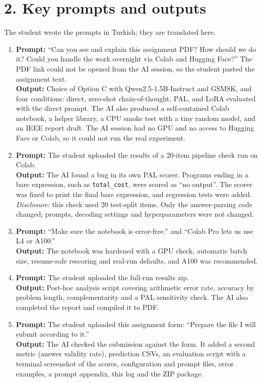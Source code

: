 \documentclass[11pt,a4paper]{article}
\begin{document}
\section*{2. Key prompts and outputs}
The student wrote the prompts in Turkish; they are translated here.
\begin{enumerate}
\item \textbf{Prompt:} ``Can you see and explain this assignment PDF? How should we do it? Could you
handle the work overnight via Colab and Hugging Face?'' The PDF link could not be opened from the AI
session, so the student pasted the assignment text.\\
\textbf{Output:} Choice of Option C with Qwen2.5-1.5B-Instruct and GSM8K, and four conditions: direct,
zero-shot chain-of-thought, PAL, and LoRA evaluated with the direct prompt. The AI also produced a
self-contained Colab notebook, a helper library, a CPU smoke test with a tiny random model, and an IEEE
report draft. The AI session had no GPU and no access to Hugging Face or Colab, so it could not run the
real experiment.
\item \textbf{Prompt:} The student uploaded the results of a 20-item pipeline check run on Colab.\\
\textbf{Output:} The AI found a bug in its own PAL scorer. Programs ending in a bare expression, such as
\texttt{total\_cost}, were scored as ``no output''. The scorer was fixed to print the final bare expression,
and regression tests were added. \emph{Disclosure:} this check used 20 test-split items. Only the
answer-parsing code changed; prompts, decoding settings and hyperparameters were not changed.
\item \textbf{Prompt:} ``Make sure the notebook is error-free.'' and ``Colab Pro lets us use L4 or A100.''\\
\textbf{Output:} The notebook was hardened with a GPU check, automatic batch size, resume-safe rescoring
and real-run defaults, and A100 was recommended.
\item \textbf{Prompt:} The student uploaded the full-run results zip.\\
\textbf{Output:} Post-hoc analysis script covering arithmetic error rate, accuracy by problem length,
complementarity and a PAL sensitivity check. The AI also completed the report and compiled it to PDF.
\item \textbf{Prompt:} The student uploaded this assignment form: ``Prepare the file I will submit according to it.''\\
\textbf{Output:} The AI checked the submission against the form. It added a second metric (answer validity rate),
prediction CSVs, an evaluation script with a terminal screenshot of the scores, configuration and prompt
files, error examples, a prompt appendix, this log and the ZIP package.
\end{enumerate}
\end{document}
